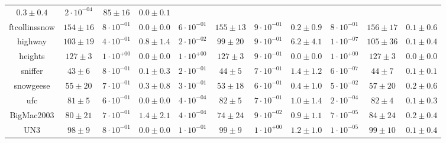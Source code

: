 \begin{table*}[!tp]
\begin{center}
\begin{tiny}
\begin{sc}
{\begin{tabular}{ccccccccccc}
                    $\mathbf{0.3 \pm 0.4}$ & $2 \cdot 10^{-04}$ & $85 \pm 16$ &
                    $0.0 \pm 0.1$ \\
                    ftcollinssnow & $154 \pm 16$ & $8 \cdot 10^{-01}$ & $0.0
                    \pm 0.0$ & $6 \cdot 10^{-01}$ & $155 \pm 13$ & $9 \cdot
                    10^{-01}$ & $0.2 \pm 0.9$ & $8 \cdot 10^{-01}$ & $156 \pm
                    17$ & $0.1 \pm 0.6$ \\
                    highway & $103 \pm 19$ & $4 \cdot 10^{-01}$ & $0.8 \pm 1.4$
                    & $2 \cdot 10^{-02}$ & $99 \pm 20$ & $9 \cdot 10^{-01}$ &
                    $\mathbf{6.2 \pm 4.1}$ & $1 \cdot 10^{-07}$ & $105 \pm 36$
                    & $0.1 \pm 0.4$ \\
                    heights & $127 \pm 3$ & $1 \cdot 10^{+00}$ & $0.0 \pm 0.0$
                    & $1 \cdot 10^{+00}$ & $127 \pm 3$ & $9 \cdot 10^{-01}$ &
                    $0.0 \pm 0.0$ & $1 \cdot 10^{+00}$ & $127 \pm 3$ & $0.0 \pm
                    0.0$ \\
                    sniffer & $43 \pm 6$ & $8 \cdot 10^{-01}$ & $0.1 \pm 0.3$ &
                    $2 \cdot 10^{-01}$ & $44 \pm 5$ & $7 \cdot 10^{-01}$ &
                    $\mathbf{1.4 \pm 1.2}$ & $6 \cdot 10^{-07}$ & $44 \pm 7$ &
                    $0.1 \pm 0.1$ \\
                    snowgeese & $55 \pm 20$ & $7 \cdot 10^{-01}$ & $0.3 \pm
                    0.8$ & $3 \cdot 10^{-01}$ & $53 \pm 18$ & $6 \cdot
                    10^{-01}$ & $0.4 \pm 1.0$ & $5 \cdot 10^{-02}$ & $57 \pm
                    20$ & $0.2 \pm 0.6$ \\
                    ufc & $81 \pm 5$ & $6 \cdot 10^{-01}$ & $\mathbf{0.0 \pm
                    0.0}$ & $4 \cdot 10^{-04}$ & $82 \pm 5$ & $7 \cdot
                    10^{-01}$ & $\mathbf{1.0 \pm 1.4}$ & $2 \cdot 10^{-04}$ &
                    $82 \pm 4$ & $0.1 \pm 0.3$ \\
                    BigMac2003 & $80 \pm 21$ & $7 \cdot 10^{-01}$ &
                    $\mathbf{1.4 \pm 2.1}$ & $4 \cdot 10^{-04}$ & $74 \pm 24$ &
                    $9 \cdot 10^{-02}$ & $\mathbf{0.9 \pm 1.1}$ & $7 \cdot
                    10^{-05}$ & $84 \pm 24$ & $0.2 \pm 0.4$ \\
                    UN3 & $98 \pm 9$ & $8 \cdot 10^{-01}$ & $0.0 \pm 0.0$ & $1
                    \cdot 10^{-01}$ & $99 \pm 9$ & $1 \cdot 10^{+00}$ &
                    $\mathbf{1.2 \pm 1.0}$ & $1 \cdot 10^{-05}$ & $99 \pm 10$ &
                    $0.1 \pm 0.4$ \\

\end{tabular}}
\end{sc}
\end{tiny}
\end{center}
\end{table*}
